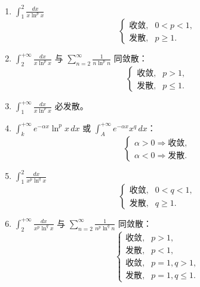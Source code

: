 \begin{enumerate}
    \item $\displaystyle \int_{1}^{2}\frac{dx}{x\ln^{p}x}$
          \[
              \begin{cases}
                  \text{收敛}, & 0<p<1,  \\
                  \text{发散}, & p\ge 1.
              \end{cases}
          \]

    \item $\displaystyle \int_{2}^{+\infty}\frac{dx}{x\ln^{p}x}$
          与 $\sum_{n=2}^{\infty}\frac{1}{n\ln^{p}n}$ 同敛散：
          \[
              \begin{cases}
                  \text{收敛}, & p>1,    \\
                  \text{发散}, & p\le 1.
              \end{cases}
          \]

    \item $\displaystyle \int_{1}^{+\infty}\frac{dx}{x\ln^{p}x}$ 必发散。

    \item $\displaystyle \int_{k}^{+\infty} e^{-\alpha x}\ln^{p}x\,dx$
          或 $\displaystyle \int_{A}^{+\infty} e^{-\alpha x}x^{q}\,dx$：
          \[
              \begin{cases}
                  \alpha>0 \Rightarrow \text{收敛}, \\
                  \alpha<0 \Rightarrow \text{发散}.
              \end{cases}
          \]

    \item $\displaystyle \int_{1}^{2}\frac{dx}{x^{p}\ln^{q}x}$
          \[
              \begin{cases}
                  \text{收敛}, & 0<q<1,  \\
                  \text{发散}, & q\ge 1.
              \end{cases}
          \]

    \item $\displaystyle \int_{2}^{+\infty}\frac{dx}{x^{p}\ln^{q}x}$
          与 $\sum_{n=2}^{\infty}\frac{1}{n^{p}\ln^{q}n}$ 同敛散：
          \[
              \begin{cases}
                  \text{收敛}, & p>1,        \\
                  \text{发散}, & p<1,        \\
                  \text{收敛}, & p=1,q>1,    \\
                  \text{发散}, & p=1,q\le 1.
              \end{cases}
          \]


\end{enumerate}
